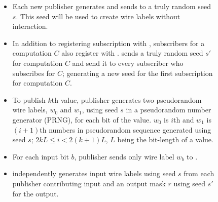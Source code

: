 \begin{figure}
\begin{mdframed}[style=myframe]

\initialize
\begin{itemize}[leftmargin=*,itemsep=4pt,topsep=4pt]
 
	\item Each new publisher generates and sends to \garbler a truly random seed
		$s$. This seed will be used to create wire labels without interaction.

\end{itemize}

\subscribe
\begin{itemize}[leftmargin=*,itemsep=4pt,topsep=4pt]

	\item In addition to registering subscription with \broker, subscribers for a
		computation $C$ also register with \garbler. \garbler sends a truly
		random seed $s'$ for computation $C$ and send it to every subscriber who
		subscribes for $C$; generating a new seed for the first subscription for
		computation $C$.
		
\end{itemize}

\publish
\begin{itemize}[leftmargin=*,itemsep=4pt,topsep=4pt]
		
	\item To publish $k$th value, publisher generates two pseudorandom wire
		labels, $w_0$ and $w_1$, using seed $s$ in a pseudorandom number generator
		(PRNG), for each bit of the value.  $w_0$ is $i$th and $w_1$ is $(i+1)$th
		numbers in pseudorandom sequence generated using seed $s$; $2kL \leq i <
		2(k+1)L$, $L$ being the bit-length of a value.

	\item For each input bit $b$, publisher sends only wire label $w_b$ to
		\broker.

\end{itemize}

\process
\begin{itemize}[leftmargin=*,itemsep=4pt,topsep=4pt]

	\item \garbler independently generates input wire labels using seed $s$ from
		each publisher contributing input and an output mask $r$ using seed $s'$
		for the output.

\end{itemize}


\end{mdframed}
\end{figure}
